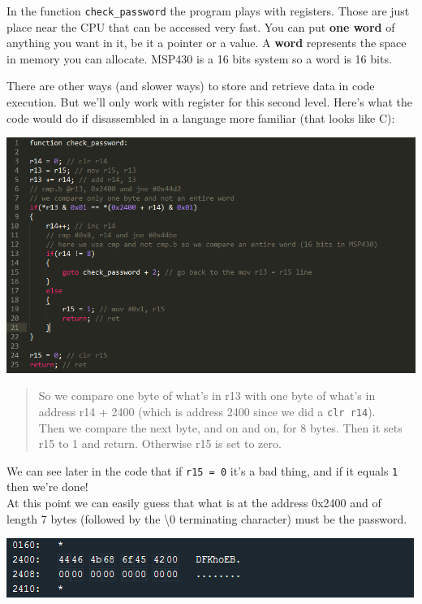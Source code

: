 \documentclass[a4paper,11pt]{article}
\begin{document}
In the function \texttt{check\_password} the program plays with
registers. Those are just place near the CPU that can be accessed very
fast. You can put \textbf{one word} of anything you want in it, be it a
pointer or a value. A \textbf{word} represents the space in memory you
can allocate. MSP430 is a 16 bits system so a word is 16 bits.

There are other ways (and slower ways) to store and retrieve data in
code execution. But we'll only work with register for this second level.
Here's what the code would do if disassembled in a language more
familiar (that looks like C):

\includegraphics{img/code1_final.PNG}

\begin{quote}
So we compare one byte of what's in r13 with one byte of what's in
address r14 + 2400 (which is address 2400 since we did a
\texttt{clr r14}).\\Then we compare the next byte, and on and on, for 8
bytes. Then it sets r15 to 1 and return. Otherwise r15 is set to zero.
\end{quote}

We can see later in the code that if \texttt{r15 = 0} it's a bad thing,
and if it equals \texttt{1} then we're done!\\At this point we can
easily guess that what is at the address 0x2400 and of length 7 bytes
(followed by the \textbackslash{}0 terminating character) must be the
password.

\includegraphics{img/1_6.png}
\end{document}

